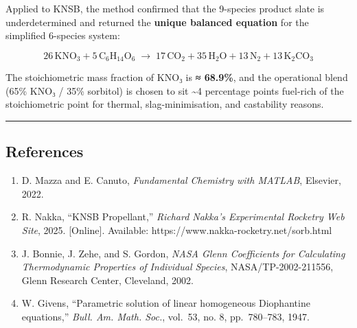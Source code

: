 \documentclass[11pt]{article}
\providecommand{\tightlist}{%
      \setlength{\itemsep}{0pt}\setlength{\parskip}{0pt}}
\begin{document}
Applied to KNSB, the method confirmed that the 9-species product slate
is underdetermined and returned the \textbf{unique balanced equation}
for the simplified 6-species system:

\[
\boxed{
26\,\text{KNO}_3 + 5\,\text{C}_6\text{H}_{14}\text{O}_6
\;\longrightarrow\;
17\,\text{CO}_2 + 35\,\text{H}_2\text{O} + 13\,\text{N}_2 + 13\,\text{K}_2\text{CO}_3
}
\]

The stoichiometric mass fraction of KNO₃ is \textbf{≈ 68.9\%}, and the
operational blend (65\% KNO₃ / 35\% sorbitol) is chosen to sit
\textasciitilde4 percentage points fuel-rich of the stoichiometric point
for thermal, slag-minimisation, and castability reasons.

    \begin{center}\rule{0.5\linewidth}{0.5pt}\end{center}

\subsection{References}\label{references}

\begin{enumerate}
\def\labelenumi{\arabic{enumi}.}
\tightlist
\item
  D. Mazza and E. Canuto, \emph{Fundamental Chemistry with MATLAB},
  Elsevier, 2022.
\item
  R. Nakka, ``KNSB Propellant,'' \emph{Richard Nakka's Experimental
  Rocketry Web Site}, 2025. {[}Online{]}. Available:
  https://www.nakka-rocketry.net/sorb.html
\item
  J. Bonnie, J. Zehe, and S. Gordon, \emph{NASA Glenn Coefficients for
  Calculating Thermodynamic Properties of Individual Species},
  NASA/TP-2002-211556, Glenn Research Center, Cleveland, 2002.
\item
  W. Givens, ``Parametric solution of linear homogeneous Diophantine
  equations,'' \emph{Bull. Am. Math. Soc.}, vol.~53, no. 8,
  pp.~780--783, 1947.
\end{enumerate}


    
    
    
\end{document}
